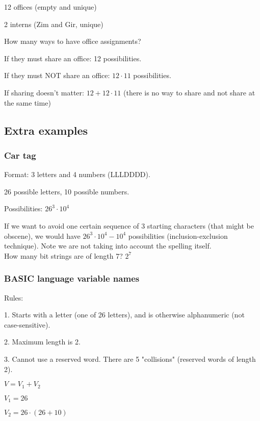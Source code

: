 \documentclass[english,openany]{book}
\begin{document}
    12 offices (empty and unique)

    2 interns (Zim and Gir, unique)

    How many ways to have office assignments?

    If they must share an office: 12 possibilities.

    If they must NOT share an office: $12 \cdot 11$ possibilities.

    If sharing doesn't matter: $12 + 12 \cdot 11$ (there is no way to share and not share at the same time)\\

    \subsection{Extra examples}

    \subsubsection{Car tag}

    Format: 3 letters and 4 numbers (LLLDDDD).

    26 possible letters, 10 possible numbers.

    Possibilities: $26^3 \cdot 10^4$

    If we want to avoid one certain sequence of 3 starting characters (that might be obscene), we would have $26^3 \cdot 10^4 - 10^4$ possibilities (inclusion-exclusion technique). Note we are not taking into account the spelling itself.\\

    How many bit strings are of length 7? $2^7$\\

    \subsubsection{BASIC language variable names}

    Rules:

    1. Starts with a letter (one of 26 letters), and is otherwise alphanumeric (not case-sensitive).

    2. Maximum length is 2.

    3. Cannot use a reserved word. There are 5 "collisions" (reserved words of length 2).

    $V = V_1 + V_2$

    $V_1 = 26$

    $V_2 = 26 \cdot (26+10)$
\end{document}
